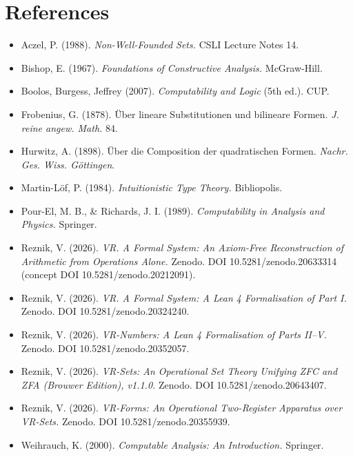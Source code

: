 \documentclass[11pt]{article}
\theoremstyle{definition}
\begin{document}
\section*{References}
\begin{itemize}
\item Aczel, P. (1988). \emph{Non-Well-Founded Sets.} CSLI Lecture Notes 14.
\item Bishop, E. (1967). \emph{Foundations of Constructive Analysis.} McGraw-Hill.
\item Boolos, Burgess, Jeffrey (2007). \emph{Computability and Logic} (5th ed.). CUP.
\item Frobenius, G. (1878). \"Uber lineare Substitutionen und bilineare Formen. \emph{J. reine angew. Math.} 84.
\item Hurwitz, A. (1898). \"Uber die Composition der quadratischen Formen. \emph{Nachr. Ges. Wiss. G\"ottingen}.
\item Martin-L\"of, P. (1984). \emph{Intuitionistic Type Theory.} Bibliopolis.
\item Pour-El, M. B., \& Richards, J. I. (1989). \emph{Computability in Analysis and Physics.} Springer.
\item Reznik, V. (2026). \emph{VR. A Formal System: An Axiom-Free Reconstruction of Arithmetic from Operations Alone.} Zenodo. DOI 10.5281/zenodo.20633314 (concept DOI 10.5281/zenodo.20212091).
\item Reznik, V. (2026). \emph{VR. A Formal System: A Lean 4 Formalisation of Part I.} Zenodo. DOI 10.5281/zenodo.20324240.
\item Reznik, V. (2026). \emph{VR-Numbers: A Lean 4 Formalisation of Parts II--V.} Zenodo. DOI 10.5281/zenodo.20352057.
\item Reznik, V. (2026). \emph{VR-Sets: An Operational Set Theory Unifying ZFC and ZFA (Brouwer Edition), v1.1.0.} Zenodo. DOI 10.5281/zenodo.20643407.
\item Reznik, V. (2026). \emph{VR-Forms: An Operational Two-Register Apparatus over VR-Sets.} Zenodo. DOI 10.5281/zenodo.20355939.
\item Weihrauch, K. (2000). \emph{Computable Analysis: An Introduction.} Springer.
\end{itemize}
\end{document}
